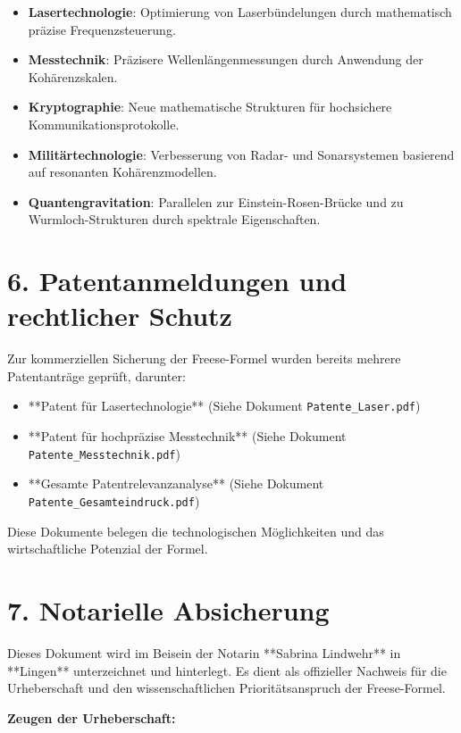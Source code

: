 \documentclass[a4paper,12pt]{article}
\begin{document}
\begin{itemize}
    \item \textbf{Lasertechnologie}: Optimierung von Laserbündelungen durch mathematisch präzise Frequenzsteuerung.
    \item \textbf{Messtechnik}: Präzisere Wellenlängenmessungen durch Anwendung der Kohärenzskalen.
    \item \textbf{Kryptographie}: Neue mathematische Strukturen für hochsichere Kommunikationsprotokolle.
    \item \textbf{Militärtechnologie}: Verbesserung von Radar- und Sonarsystemen basierend auf resonanten Kohärenzmodellen.
    \item \textbf{Quantengravitation}: Parallelen zur Einstein-Rosen-Brücke und zu Wurmloch-Strukturen durch spektrale Eigenschaften.
\end{itemize}

\section*{6. Patentanmeldungen und rechtlicher Schutz}

Zur kommerziellen Sicherung der Freese-Formel wurden bereits mehrere Patentanträge geprüft, darunter:

\begin{itemize}
    \item **Patent für Lasertechnologie** (Siehe Dokument \texttt{Patente\_Laser.pdf})
    \item **Patent für hochpräzise Messtechnik** (Siehe Dokument \texttt{Patente\_Messtechnik.pdf})
    \item **Gesamte Patentrelevanzanalyse** (Siehe Dokument \texttt{Patente\_Gesamteindruck.pdf})
\end{itemize}

Diese Dokumente belegen die technologischen Möglichkeiten und das wirtschaftliche Potenzial der Formel.

\section*{7. Notarielle Absicherung}

Dieses Dokument wird im Beisein der Notarin **Sabrina Lindwehr** in **Lingen** unterzeichnet und hinterlegt. Es dient als offizieller Nachweis für die Urheberschaft und den wissenschaftlichen Prioritätsanspruch der Freese-Formel.

\textbf{Zeugen der Urheberschaft:}
\end{document}
